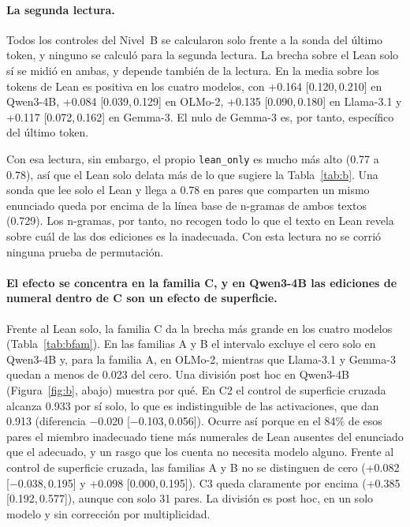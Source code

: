 \documentclass[10pt]{article}
\newcommand{\vr}[1]{\texttt{#1}}
\newcommand{\ic}[2]{[#1,\,#2]}
\begin{document}
\paragraph{La segunda lectura.}
Todos los controles del Nivel~B se calcularon solo frente a la sonda del último token, y ninguno se calculó para la
segunda lectura. La brecha sobre el Lean solo sí se midió en ambas, y depende también de la lectura. En la media
sobre los tokens de Lean es positiva en los cuatro modelos, con +0.164 \ic{0.120}{0.210} en Qwen3-4B, +0.084
\ic{0.039}{0.129} en OLMo-2, +0.135 \ic{0.090}{0.180} en Llama-3.1 y +0.117 \ic{0.072}{0.162} en Gemma-3. El nulo
de Gemma-3 es, por tanto, específico del último token.

Con esa lectura, sin embargo, el propio \vr{lean\_only} es mucho más alto (0.77 a 0.78), así que el Lean solo
delata más de lo que sugiere la Tabla~\ref{tab:b}. Una sonda que lee solo el Lean y llega a 0.78 en pares que
comparten un mismo enunciado queda por encima de la línea base de n-gramas de ambos textos (0.729). Los n-gramas,
por tanto, no recogen todo lo que el texto en Lean revela sobre cuál de las dos ediciones es la inadecuada. Con
esta lectura no se corrió ninguna prueba de permutación.

\paragraph{El efecto se concentra en la familia C, y en Qwen3-4B las ediciones de numeral dentro de C son un efecto de superficie.}
Frente al Lean solo, la familia C da la brecha más grande en los cuatro modelos (Tabla~\ref{tab:bfam}). En las
familias A y B el intervalo excluye el cero solo en Qwen3-4B y, para la familia A, en OLMo-2, mientras que
Llama-3.1 y Gemma-3 quedan a menos de 0.023 del cero.
Una división post hoc en Qwen3-4B (Figura~\ref{fig:b}, abajo) muestra por qué. En C2 el control de superficie cruzada
alcanza 0.933 por sí solo, lo que es indistinguible de las activaciones, que dan 0.913 (diferencia −0.020
\ic{−0.103}{0.056}). Ocurre así porque en el 84\% de esos pares el miembro inadecuado tiene más numerales de Lean
ausentes del enunciado que el adecuado, y un rasgo que los cuenta no necesita modelo alguno. Frente al
control de superficie cruzada, las familias A y B no se distinguen de cero (+0.082 \ic{−0.038}{0.195} y +0.098
\ic{0.000}{0.195}). C3 queda claramente por encima (+0.385 \ic{0.192}{0.577}), aunque con solo 31 pares. La
división es post hoc, en un solo modelo y sin corrección por multiplicidad.
\end{document}
